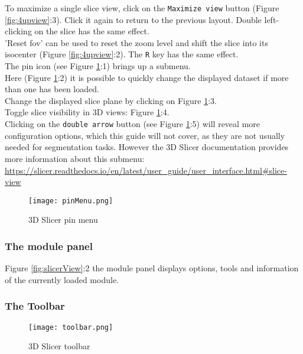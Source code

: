 \noindent
To maximize a single slice view, click on the \texttt{Maximize view} button (Figure \ref{fig:4upview}:3). Click it again to return to the previous layout. Double left-clicking on the slice has the same effect.\\

\noindent
'Reset \gls{fov}' can be used to reset the zoom level and shift the slice into its isocenter (Figure \ref{fig:4upview}:2). The \texttt{R} key has the same effect.\\

\noindent
The pin icon (see Figure \ref{fig:pinMenu}:1) brings up a submenu.\\
\noindent
Here (Figure \ref{fig:pinMenu}:2) it is possible to quickly change the displayed dataset if more than one has been loaded.\\
Change the displayed slice plane by clicking on Figure \ref{fig:pinMenu}:3.\\
Toggle slice visibility in 3D views: Figure \ref{fig:pinMenu}:4.\\
Clicking on the \texttt{double arrow} button (see Figure \ref{fig:pinMenu}:5) will reveal more configuration options, which this guide will not cover, as they are not usually needed for segmentation tasks. However the 3D Slicer documentation provides more information about this submenu: \url{https://slicer.readthedocs.io/en/latest/user_guide/user_interface.html#slice-view}
\begin{figure}[h!] %
	\centerline{ %
		\texttt{[image: pinMenu.png]}}
	\caption{3D Slicer pin menu}
	\label{fig:pinMenu}
\end{figure}
\pagebreak

\subsubsection{The module panel}
Figure \ref{fig:slicerView}:2 the module panel displays options, tools and information of the currently loaded module.

\subsubsection{The Toolbar}
\begin{figure}[h!] %
	\centerline{ %
		\texttt{[image: toolbar.png]}}
	\caption{3D Slicer toolbar}
	\label{fig:toolbar}
\end{figure}

